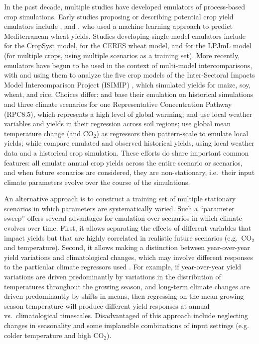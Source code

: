 \documentclass[esd, final]{copernicus} %
\begin{document}
In the past decade, multiple studies have developed emulators of process-based crop simulations. Early studies proposing or describing potential crop yield emulators include \citet{Howden2005, raisen2006, Lobell2010}, and \citet{Ferrise2011}, who used a machine learning approach to predict Mediterranean wheat yields. Studies developing single-model emulators include  \citet{Holzkamper2012} for the CropSyst model, \citet{RUANE2013a} for the CERES wheat model, and \citet{Oyebamiji15} for the LPJmL model (for multiple crops, using multiple scenarios as a training set). More recently, emulators have begun to be used in the context of multi-model intercomparisons, with \citet{BLANC2015, BLANC2017, Ostberg2018} and \citet{Mistry2017} using them to analyze the five crop models of the Inter-Sectoral Impacts Model Intercomparison Project (ISIMIP) \citep{Warszawski3228}, which simulated yields for maize, soy, wheat, and rice. Choices differ: \citet{BLANC2015} and \citet{BLANC2017} base their emulation on historical simulations and three climate scenarios for one Representative Concentration Pathway (RPC8.5), which represents a high level of global warming; and use local weather variables and yields in their regression across soil regions; \citet{Ostberg2018} use global mean temperature change (and CO$_2$) as regressors then pattern-scale to emulate local yields; while \citet{Mistry2017} compare emulated and observed historical yields, using local weather data and a historical crop simulation. These efforts do share important common features: all emulate annual crop yields across the entire scenario or scenarios, and when future scenarios are considered, they are non-stationary, i.e.\ their input climate parameters evolve over the course of the simulations.

An alternative approach is to construct a training set of multiple stationary scenarios in which parameters are systematically varied. Such a ``parameter sweep'' offers several advantages for emulation over scenarios in which climate evolves over time. First, it allows separating the effects of different variables that impact yields but that are highly correlated in realistic future scenarios (e.g.\ CO$_2$ and temperature). Second, it allows making a distinction between year-over-year yield variations and climatological changes, which may involve different responses to the particular climate regressors used \citep[e.g.][]{Ruane2016}. For example, if year-over-year yield variations are driven predominantly by variations in the distribution of temperatures throughout the growing season, and long-term climate changes are driven predominantly by shifts in means, then regressing on the mean growing season temperature will produce different yield responses at annual vs.\ climatological timescales. Disadvantaged of this approach include neglecting changes in seasonality and some implausible combinations of input settings (e.g. colder temperature and high CO$_2$). 
\end{document}
